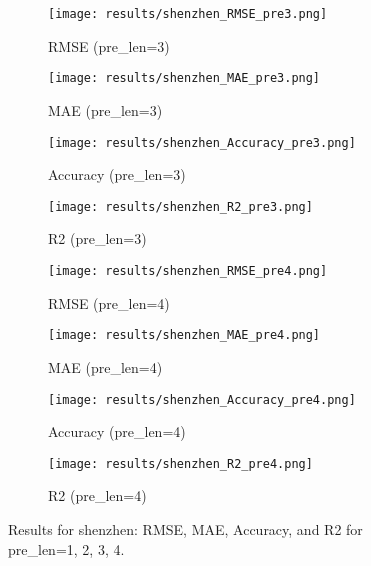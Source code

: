 \documentclass{article}
\begin{document}
\begin{figure}[htbp]
    \begin{subfigure}[b]{0.24\textwidth}
        \texttt{[image: results/shenzhen\_RMSE\_pre3.png]}
        \caption{RMSE (pre\_len=3)}
    \end{subfigure}
    \begin{subfigure}[b]{0.24\textwidth}
        \texttt{[image: results/shenzhen\_MAE\_pre3.png]}
        \caption{MAE (pre\_len=3)}
    \end{subfigure}
    \begin{subfigure}[b]{0.24\textwidth}
        \texttt{[image: results/shenzhen\_Accuracy\_pre3.png]}
        \caption{Accuracy (pre\_len=3)}
    \end{subfigure}
    \begin{subfigure}[b]{0.24\textwidth}
        \texttt{[image: results/shenzhen\_R2\_pre3.png]}
        \caption{R2 (pre\_len=3)}
    \end{subfigure}

    \begin{subfigure}[b]{0.24\textwidth}
        \texttt{[image: results/shenzhen\_RMSE\_pre4.png]}
        \caption{RMSE (pre\_len=4)}
    \end{subfigure}
    \begin{subfigure}[b]{0.24\textwidth}
        \texttt{[image: results/shenzhen\_MAE\_pre4.png]}
        \caption{MAE (pre\_len=4)}
    \end{subfigure}
    \begin{subfigure}[b]{0.24\textwidth}
        \texttt{[image: results/shenzhen\_Accuracy\_pre4.png]}
        \caption{Accuracy (pre\_len=4)}
    \end{subfigure}
    \begin{subfigure}[b]{0.24\textwidth}
        \texttt{[image: results/shenzhen\_R2\_pre4.png]}
        \caption{R2 (pre\_len=4)}
    \end{subfigure}

    \caption{Results for shenzhen: RMSE, MAE, Accuracy, and R2 for pre\_len=1, 2, 3, 4.}
\end{figure}
\end{document}
